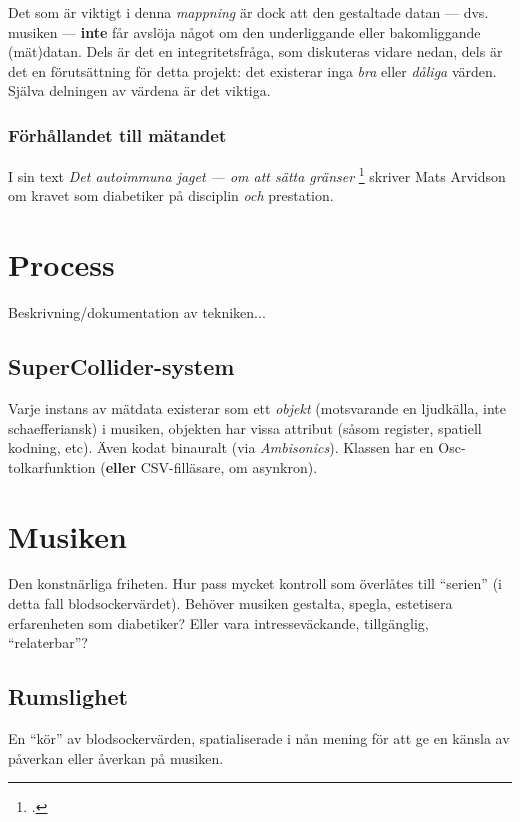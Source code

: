 \documentclass[11pt, twoside, a4paper]{article}
\begin{document}
\begin{multicols}{2}
Det som är viktigt i denna \emph{mappning} är dock att den gestaltade datan --- dvs. musiken --- \textbf{inte} får avslöja något om den underliggande eller bakomliggande (mät)datan. Dels är det en integritetsfråga, som diskuteras vidare nedan, dels är det en förutsättning för detta projekt: det existerar inga \emph{bra} eller \emph{dåliga} värden. Själva delningen av värdena är det viktiga.

\subsubsection{Förhållandet till mätandet}
I sin text \emph{Det autoimmuna jaget --- om att sätta gränser} \footcite[286]{arvidson_det_2016} skriver Mats Arvidson om kravet som diabetiker på disciplin \emph{och} prestation.

\section*{Process}
Beskrivning/dokumentation av tekniken...


\subsection*{SuperCollider-system}
Varje instans av mätdata existerar som ett \emph{objekt} (motsvarande en ljudkälla, inte schaefferiansk) i musiken, objekten har vissa attribut (såsom register, spatiell kodning, etc). Även kodat binauralt (via \emph{Ambisonics}). Klassen har en Osc-tolkarfunktion (\textbf{eller} CSV-filläsare, om asynkron).

\section*{Musiken}
Den konstnärliga friheten. Hur pass mycket kontroll som överlåtes till \enquote{serien} (i detta fall blodsockervärdet). Behöver musiken gestalta, spegla, estetisera erfarenheten som diabetiker? Eller vara intresseväckande, tillgänglig, \enquote{relaterbar}? 

\subsection*{Rumslighet}
En \enquote{kör} av blodsockervärden, spatialiserade i nån mening för att ge en känsla av påverkan eller åverkan på musiken. 


\end{multicols}
\end{document}
